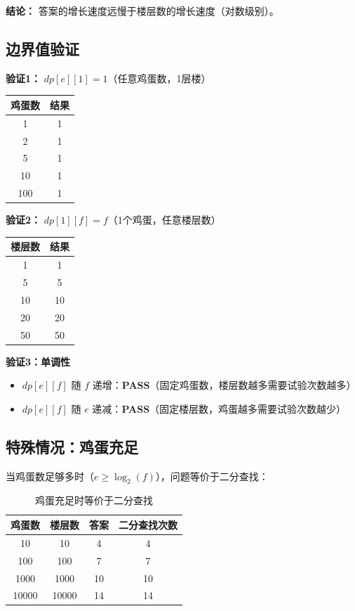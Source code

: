 \documentclass[12pt,a4paper]{article}
\begin{document}
\textbf{结论：} 答案的增长速度远慢于楼层数的增长速度（对数级别）。

\subsection{边界值验证}

\textbf{验证1：} $dp[e][1] = 1$（任意鸡蛋数，1层楼）

\begin{table}[H]
\centering
\begin{tabular}{@{}cc@{}}
\toprule
\textbf{鸡蛋数} & \textbf{结果} \\
\midrule
1 & 1 \\
2 & 1 \\
5 & 1 \\
10 & 1 \\
100 & 1 \\
\bottomrule
\end{tabular}
\end{table}

\textbf{验证2：} $dp[1][f] = f$（1个鸡蛋，任意楼层数）

\begin{table}[H]
\centering
\begin{tabular}{@{}cc@{}}
\toprule
\textbf{楼层数} & \textbf{结果} \\
\midrule
1 & 1 \\
5 & 5 \\
10 & 10 \\
20 & 20 \\
50 & 50 \\
\bottomrule
\end{tabular}
\end{table}

\textbf{验证3：单调性}
\begin{itemize}
    \item $dp[e][f]$ 随 $f$ 递增：\textbf{PASS}（固定鸡蛋数，楼层数越多需要试验次数越多）
    \item $dp[e][f]$ 随 $e$ 递减：\textbf{PASS}（固定楼层数，鸡蛋越多需要试验次数越少）
\end{itemize}

\subsection{特殊情况：鸡蛋充足}

当鸡蛋数足够多时（$e \geq \log_2(f)$），问题等价于二分查找：

\begin{table}[H]
\centering
\caption{鸡蛋充足时等价于二分查找}
\label{tab:sufficient_eggs}
\begin{tabular}{@{}cccc@{}}
\toprule
\textbf{鸡蛋数} & \textbf{楼层数} & \textbf{答案} & \textbf{二分查找次数} \\
\midrule
10 & 10 & 4 & 4 \\
100 & 100 & 7 & 7 \\
1000 & 1000 & 10 & 10 \\
10000 & 10000 & 14 & 14 \\
\bottomrule
\end{tabular}
\end{table}
\end{document}
